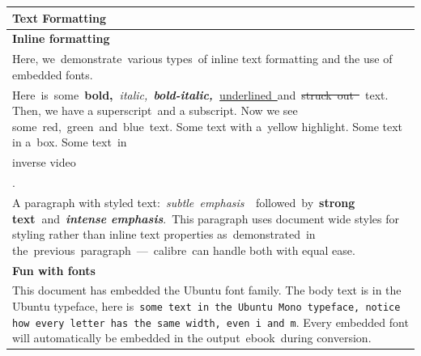 \documentclass[\officeparserdriver 12pt]{article}
\begin{document}
\begin{longtable}{|*{1}{>{\raggedright\arraybackslash}p{\dimexpr(\linewidth-2\tabcolsep-2\arrayrulewidth)/1\relax}|}}
\hline
\textcolor{hex365F91}{\textbf{{\fontsize{14pt}{16.8pt}\selectfont Text Formatting~}}} \\
\hline
\endhead
\textcolor{hex4F81BD}{\textbf{{\fontsize{13pt}{15.6pt}\selectfont Inline formatting~}}} \\
\hline
\textcolor{hex000000}{Here, we~demonstrate~various types~of inline text formatting and the use of embedded fonts.~} \\
\hline
\textcolor{hex000000}{Here~is~some~}\textcolor{hex000000}{\textbf{bold,~}}\textcolor{hex000000}{\textit{italic,~}}\textcolor{hex000000}{\textit{\textbf{bold-italic,~}}}\textcolor{hex000000}{\uline{underlined~}}\textcolor{hex000000}{and~}\textcolor{hex000000}{\sout{struck~out~}}\textcolor{hex000000}{~text. Then, we have a super}\textcolor{hex000000}{{\fontsize{9pt}{10.8pt}\selectfont script}}\textcolor{hex000000}{~and a sub}\textcolor{hex000000}{{\fontsize{9pt}{10.8pt}\selectfont script}}\textcolor{hex000000}{. Now we see some~}\textcolor{hexFF0000}{red}\textcolor{hex000000}{,~}\textcolor{hex92D050}{green}\textcolor{hex000000}{~and~}\textcolor{hex0070C0}{blue}\textcolor{hex000000}{~text. Some text with a~yellow highlight. Some text in a~box. Some text~in~} \\
\hline
\textcolor{hexFFFFFF}{inverse video} \\
\hline
\textcolor{hex000000}{.} \\
\hline
\textcolor{hex000000}{A paragraph with styled text:~}\textcolor{hex808080}{\textit{subtle~emphasis~~}}\textcolor{hex000000}{followed~by~}\textcolor{hex000000}{\textbf{strong text~}}\textcolor{hex000000}{and~}\textcolor{hex4F81BD}{\textit{\textbf{intense emphasis}}}\textcolor{hex000000}{.~This paragraph uses document wide styles for styling rather than inline text properties as~demonstrated~in the~previous~paragraph~—~calibre~can handle both with equal ease.~} \\
\hline
\textcolor{hex4F81BD}{\textbf{{\fontsize{13pt}{15.6pt}\selectfont Fun with fonts~}}} \\
\hline
\textcolor{hex000000}{This document has embedded the Ubuntu font family. The body text is in the Ubuntu typeface, here is~}\textcolor{hex000000}{\texttt{some text in the Ubuntu Mono typeface, notice how every letter has the same width, even~i~and m}}\textcolor{hex000000}{. Every embedded font will automatically be embedded in the output~ebook~during conversion.~~} \\

\end{longtable}
\end{document}
